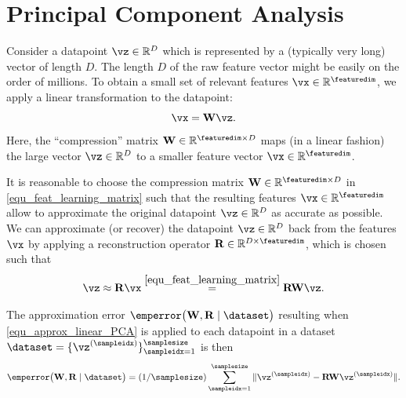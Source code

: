 \documentclass[12pt]{report}
\begin{document}
\section{Principal Component Analysis} 
\label{sec_pca}

Consider a datapoint $\vz \in \mathbb{R}^{D}$ which is represented by a (typically very long) 
vector of length $D$. The length $D$ of the raw feature vector might be easily on the order of 
millions. To obtain a small set of relevant features $\vx \in \mathbb{R}^{\featuredim}$, we apply 
a linear transformation to the datapoint: 
\begin{equation} 
\label{equ_feat_learning_matrix}
\vx = \mathbf{W} \vz.
\end{equation}
Here, the ``compression'' matrix $\mathbf{W} \in \mathbb{R}^{\featuredim \times D}$ maps 
(in a linear fashion) the large vector $\vz \in \mathbb{R}^{D}$ to a smaller feature vector $\vx \in \mathbb{R}^{\featuredim}$. %


It is reasonable to choose the compression matrix $\mathbf{W} \in \mathbb{R}^{\featuredim \times D}$ 
in \eqref{equ_feat_learning_matrix} such that the resulting features $\vx \in \mathbb{R}^{\featuredim}$ 
allow to approximate the original datapoint $\vz \in \mathbb{R}^{D}$ as accurate as possible. We can 
approximate (or recover) the datapoint $\vz \in \mathbb{R}^{D}$ back from the features $\vx$ by 
applying a reconstruction operator $\mathbf{R} \in \mathbb{R}^{D \times \featuredim}$, which is 
chosen such that 
\begin{equation} 
\label{equ_approx_linear_PCA}
\vz \approx \mathbf{R} \vx \stackrel{\eqref{equ_feat_learning_matrix}}{=} \mathbf{R} \mathbf{W} \vz. 
\end{equation} 

The approximation error $\emperror \big( \mathbf{W},\mathbf{R} \mid \dataset\big)$ resulting 
when \eqref{equ_approx_linear_PCA} is applied to each datapoint in a 
dataset $\dataset=  \{ \vz^{(\sampleidx)}\}_{\sampleidx=1}^{\samplesize}$ is then
\begin{equation} 
\label{equ_app_error_PCA}
\emperror \big( \mathbf{W},\mathbf{R} \mid \dataset\big) = (1/\samplesize) \sum_{\sampleidx=1}^{\samplesize} \| \vz^{(\sampleidx)} - \mathbf{R} \mathbf{W} \vz^{(\sampleidx)} \|. 
\end{equation} 
\end{document}
